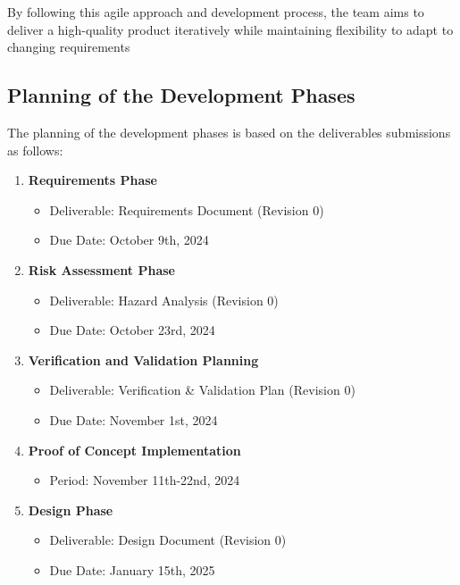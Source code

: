 \documentclass[12pt]{article}
\begin{document}
By following this agile approach and development process, the team
aims to deliver a high-quality product iteratively while maintaining
flexibility to adapt to changing requirements

\subsection{Planning of the Development Phases}

The planning of the development phases is based on the deliverables
submissions as follows:

\begin{enumerate}

  \item \textbf{Requirements Phase}
    \begin{itemize}
      \item Deliverable: Requirements Document (Revision 0)
      \item Due Date: October 9th, 2024
    \end{itemize}

  \item \textbf{Risk Assessment Phase}
    \begin{itemize}
      \item Deliverable: Hazard Analysis (Revision 0)
      \item Due Date: October 23rd, 2024
    \end{itemize}

  \item \textbf{Verification and Validation Planning}
    \begin{itemize}
      \item Deliverable: Verification \& Validation Plan (Revision 0)
      \item Due Date: November 1st, 2024
    \end{itemize}

  \item \textbf{Proof of Concept Implementation}
    \begin{itemize}
      \item Period: November 11th-22nd, 2024
    \end{itemize}

  \item \textbf{Design Phase}
    \begin{itemize}
      \item Deliverable: Design Document (Revision 0)
      \item Due Date: January 15th, 2025
    \end{itemize}


\end{enumerate}
\end{document}
